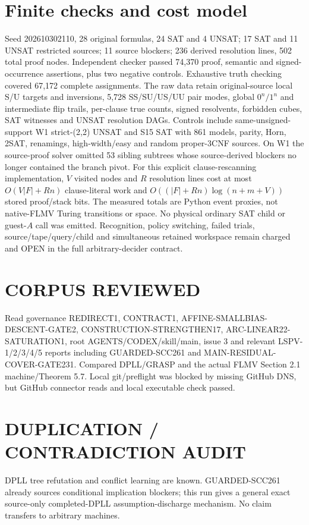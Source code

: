 \documentclass[11pt]{article}
\begin{document}
\section{Finite checks and cost model}
Seed 202610302110, 28 original formulas, 24 SAT and 4 UNSAT; 17 SAT and 11 UNSAT restricted sources; 11 source blockers; 236 derived resolution lines, 502 total proof nodes. Independent checker passed 74,370 proof, semantic and signed-occurrence assertions, plus two negative controls. Exhaustive truth checking covered 67,172 complete assignments. The raw data retain original-source local S/U targets and inversions, 5,728 SS/SU/US/UU pair modes, global $0^n/1^n$ and intermediate flip trails, per-clause true counts, signed resolvents, forbidden cubes, SAT witnesses and UNSAT resolution DAGs. Controls include same-unsigned-support W1 strict-(2,2) UNSAT and S15 SAT with 861 models, parity, Horn, 2SAT, renamings, high-width/easy and random proper-3CNF sources. On W1 the source-proof solver omitted 53 sibling subtrees whose source-derived blockers no longer contained the branch pivot.
For this explicit clause-rescanning implementation, $V$ visited nodes and $R$ resolution lines cost at most $O(V|F|+Rn)$ clause-literal work and $O((|F|+Rn)\log(n+m+V))$ stored proof/stack bits. The measured totals are Python event proxies, not native-FLMV Turing transitions or space. No physical ordinary SAT child or guest-$A$ call was emitted. Recognition, policy switching, failed trials, source/tape/query/child and simultaneous retained workspace remain charged and OPEN in the full arbitrary-decider contract.
\section{CORPUS REVIEWED}
Read governance REDIRECT1, CONTRACT1, AFFINE-SMALLBIAS-DESCENT-GATE2, CONSTRUCTION-STRENGTHEN17, ARC-LINEAR22-SATURATION1, root AGENTS/CODEX/skill/main, issue 3 and relevant LSPV-1/2/3/4/5 reports including GUARDED-SCC261 and MAIN-RESIDUAL-COVER-GATE231. Compared DPLL/GRASP and the actual FLMV Section 2.1 machine/Theorem 5.7. Local git/preflight was blocked by missing GitHub DNS, but GitHub connector reads and local executable check passed.
\section{DUPLICATION / CONTRADICTION AUDIT}
DPLL tree refutation and conflict learning are known. GUARDED-SCC261 already sources conditional implication blockers; this run gives a general exact source-only completed-DPLL assumption-discharge mechanism. No claim transfers to arbitrary machines.
\end{document}
